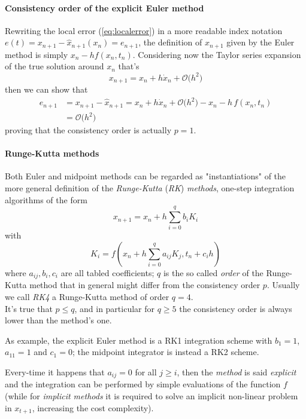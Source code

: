 	\paragraph{Consistency order of the explicit Euler method} Rewriting the local error (\ref{eq:localerror}) in a more readable index notation $e(t) = x_{n+1} - \hat x_{n+1}(x_n) = e_{n+1}$, the definition of $\hat x_{n+1}$ given by the Euler method is simply $x_n - h f(x_n, t_n)$. Considering now the Taylor series expansion of the true solution around $x_n$ that's
	\[ x_{n+1} = x_n + h \dot x_n + \mathcal O\big(h^2\big) \]
	then we can show that
	\begin{align*}
		e_{n+1} & = x_{n+1} - \hat x_{n+1} = x_n + h \dot x_n + \mathcal O\big(h^2\big) - x_n - h \, f(x_n, t_n) \\
		& = \mathcal O \big(h^2\big)
	\end{align*}
	proving that the consistency order is actually $p = 1$.
	
	\paragraph{Runge-Kutta methods} Both Euler and midpoint methods can be regarded as "instantiations" of the more general definition of the \textit{Runge-Kutta} (\textit{RK}) \textit{methods}, one-step integration algorithms of the form
	\begin{equation}
		x_{n+1} = x_n + h \sum_{i=0}^q b_i K_i
	\end{equation}
	with
	\[ K_i = f\left( x_n + h \sum_{i=0}^q a_{ij} K_j, t_n + c_ih \right) \]
	where $a_{ij},b_i,c_i$ are all tabled coefficients; $q$ is the so called \textit{order} of the Runge-Kutta method that in general might differ from the consistency order $p$. Usually we call \textit{RK4} a Runge-Kutta method of order $q=4$.\\
	It's true that $p \leq q$, and in particular for $q \geq 5$ the consistency order is always lower than the method's one.
	
	As example, the explicit Euler method is a RK1 integration scheme with $b_1 = 1$, $a_{11} = 1$ and $c_1 = 0$; the midpoint integrator is instead a RK2 scheme.
	
	Every-time it happens that $a_{ij} = 0$ for all $j \geq i$, then the \textit{method} is said \textit{explicit} and the integration can be performed by simple evaluations of the function $f$ (while for \textit{implicit methods} it is required to solve an implicit non-linear problem in $x_{t+1}$, increasing the cost complexity).
	
